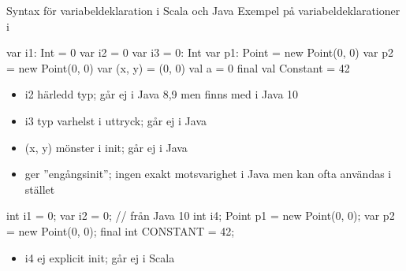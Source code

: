 \begin{Slide}{Syntax för variabeldeklaration i Scala och Java}\SlideFontSmall
Exempel på variabeldeklarationer i
\begin{multicols}{2}
\noindent{}
\begin{CodeSmall}[basicstyle=\ttfamily\SlideFontSize{7}{10},backgroundcolor=\color{white},
  frame=none]
  var i1: Int = 0
  var i2 = 0
  var i3 = 0: Int
  var p1: Point = new Point(0, 0)
  var p2 = new Point(0, 0)
  var (x, y) = (0, 0)
  val a = 0
  final val Constant = 42
\end{CodeSmall}
\begin{itemize}\SlideFontTiny
\item i2 härledd typ; går ej i Java 8,9 men finns med  i Java 10

\item i3 typ varhelst i uttryck; går ej i Java

\item (x, y) mönster i init; går ej i Java

\item {} ger ''engångsinit''; ingen exakt motsvarighet i Java men  kan ofta användas i stället
\end{itemize}

\columnbreak

\noindent{}
\begin{CodeSmall}[language=Java,morekeywords={var},basicstyle=\ttfamily\SlideFontSize{7}{10},backgroundcolor=\color{white},
  frame=none]
  int i1 = 0;
  var i2 = 0; // från Java 10
  int i4;
  Point p1 = new Point(0, 0);
  var p2 = new Point(0, 0); 
  final int CONSTANT = 42;
\end{CodeSmall}
\begin{itemize}\SlideFontTiny
\item i4 ej explicit init; går ej i Scala
\end{itemize}
\end{multicols}

\end{Slide}




